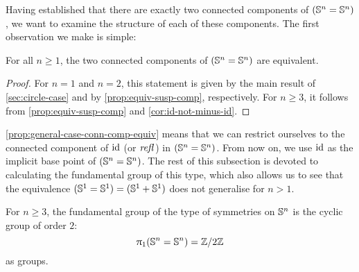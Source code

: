 \documentclass[english,a4]{article}
\begin{document}
Having established that there are exactly two connected components of $({\mathbb S^{n}} = {\mathbb S^{n}})$, we want to examine the structure of each of these components.
The first observation we make is simple:

\begin{proposition} \label{prop:general-case-conn-comp-equiv}
    For all $n \geq 1$, the two connected components of $({\mathbb S^{n}} = {\mathbb S^{n}})$ are equivalent.
\end{proposition}
\begin{proof}
    For $n=1$ and $n=2$, this statement is given by the main result of \cref{sec:circle-case} and by \cref{prop:equiv-susp-comp}, respectively.
	For $n \geq 3$, it follows from \cref{prop:equiv-susp-comp} and \cref{cor:id-not-minus-id}.
\end{proof}

\cref{prop:general-case-conn-comp-equiv} means that we can restrict ourselves to the connected component of $\mathord{\mathrm{id}}$ (or $\mathop{{\mathit{refl}}_{}}$) in $({\mathbb S^{n}} = {\mathbb S^{n}})$. From now on, we use $\mathord{\mathrm{id}}$ as the implicit base point of $({\mathbb S^{n}} = {\mathbb S^{n}})$.
The rest of this subsection is devoted to calculating the fundamental group of this type, which also allows us to see that the equivalence $({\mathbb S^{1}} = {\mathbb S^{1}}) = ({\mathbb S^{1}} + {\mathbb S^{1}})$ does not generalise for $n > 1$.


\begin{theorem} \label{thm:fund-grp-of-symmetries}
    For $n \geq 3$, the fundamental group of the type of symmetries on ${\mathbb S^{n}}$ is the cyclic group of order $2$:
    \begin{equation}
    \uppi_{1}({\mathbb S^{n}} = {\mathbb S^{n}}) = \mathbb{Z} \slash 2\mathbb{Z}
    \end{equation}
    as groups.
\end{theorem}
\end{document}
